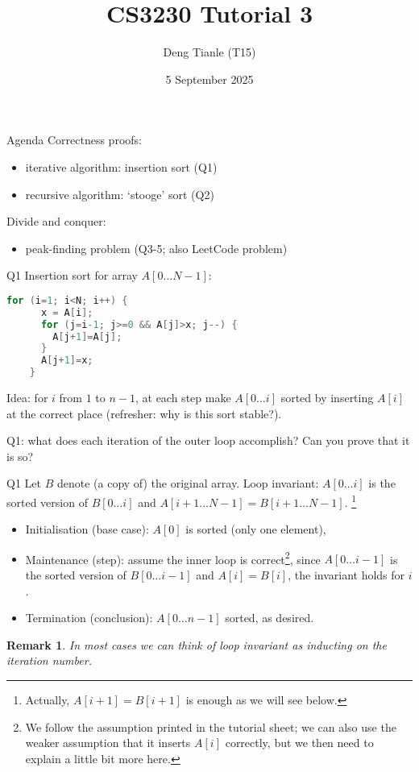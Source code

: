 \documentclass[t]{beamer}
\title{CS3230 Tutorial 3}
\author{Deng Tianle (T15)}
\date{5 September 2025}
\newtheorem{remark}{Remark}
\begin{document}
\frame{\titlepage} 

\begin{frame}{Agenda}
  Correctness proofs:
  \begin{itemize}
    \item iterative algorithm: insertion sort (Q1)
    \item recursive algorithm: `stooge' sort (Q2)
  \end{itemize}
  Divide and conquer:
  \begin{itemize}
    \item peak-finding problem (Q3-5; also LeetCode problem)
  \end{itemize}
\end{frame}
\begin{frame}[fragile]{Q1}
  Insertion sort for array $A[0\dots N-1]$:
  \begin{lstlisting}[language=C]
    for (i=1; i<N; i++) {
      x = A[i];
      for (j=i-1; j>=0 && A[j]>x; j--) {
        A[j+1]=A[j];
      }
      A[j+1]=x;
    }
  \end{lstlisting}
  Idea: for $i$ from $1$ to $n-1$, at each step make $A[0 \dots i]$ sorted by inserting $A[i]$ at the correct place (refresher: why is this sort stable?). 
  \par Q1: what does each iteration of the outer loop accomplish? Can you prove that it is so? 
\end{frame}
\begin{frame}{Q1}
  Let $B$ denote (a copy of) the original array. Loop invariant: $A[0 \dots i]$ is the sorted version of $B[0 \dots i]$ and $A[i+1 \dots N-1] = B[i+1 \dots N-1]$. \footnote{Actually, $A[i+1]=B[i+1]$ is enough as we will see below. } 
  \begin{itemize}
    \item Initialisation (base case): $A[0]$ is sorted (only one element), 
    \item Maintenance (step): assume the inner loop is correct\footnote{We follow the assumption printed in the tutorial sheet; we can also use the weaker assumption that it inserts $A[i]$ correctly, but we then need to explain a little bit more here. }, since $A[0 \dots i-1]$ is the sorted version of $B[0 \dots i-1]$ and $A[i]=B[i]$, the invariant holds for $i$. 
    \item Termination (conclusion): $A[0\dots n-1]$ sorted, as desired.
  \end{itemize}
  \begin{remark}
    In most cases we can think of loop invariant as inducting on the iteration number. 
  \end{remark}
\end{frame}
\end{document}
